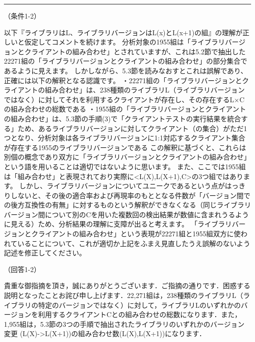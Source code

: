 \documentclass{jarticle} %
\def\subsection#1{ \vspace{1pc} {\gt #1} }
\def\nextans{ \vspace{2pc} \hrule }
\begin{document}
\newpage
\nextans
\subsection{（条件1-2）}

以下『ライブラリはL、ライブラリバージョンはL(x)とL(x+1)の組』の理解が正しいと仮定してコメントを続けます。
分析対象の1955組は「ライブラリバージョンとクライアントの組み合わせ」とされていますが、これは5.2節で抽出した22271組の「ライブラリバージョンとクライアントの組み合わせ」の部分集合であるように見えます。
しかしながら、5.3節を読みなおすとこれは誤解であり、正確には以下の解釈となる認識です。
・22271組の「ライブラリバージョンとクライアントの組み合わせ」は、238種類のライブラリL（ライブラリバージョンではなく）に対してそれを利用するクライアントが存在し、その存在するL×Cの組み合わせの総数である
・1955組の「ライブラリバージョンとクライアントの組み合わせ」は、5.3節の手順(3)で「クライアントテストの実行結果を統合する」ため、あるライブラリバージョンに対してクライアント（の集合）がただ1つとなり、分析対象は各ライブラリバージョンに1:1対応するクライアント集合が存在する1955のライブラリバージョンである
この解釈に基づくと、これらは別個の概念であり双方に「ライブラリバージョンとクライアントの組み合わせ」という語を用いることは適切ではないように思います。
また、ここでは1955組は「組み合わせ」と表現されており実際に<L(X),L(X+1),C>の3つ組ではあります。
しかし、ライブラリバージョンについてユニークであるという点がはっきりしないと、その後の適合率および再現率のもととなる件数が「バージョン間での後方互換性の有無」に対するものという解釈ができなくなる（同じライブラリバージョン間について別のCを用いた複数回の検出結果が数値に含まれうるように見える）ため、分析結果の理解に支障が出ると考えます。
「ライブラリバージョンとクライアントの組み合わせ」という表現が22271組と1955組双方に使われていることについて、これが適切か上記をふまえ見直したうえ誤解のないよう記述を修正してください。


\subsection{（回答1-2）}

貴重な御指摘を頂き，誠にありがとうございます．ご指摘の通りです．困惑する説明となったことお詫び申し上げます．22,271組は，238種類のライブラリL（ライブラリの特定のバージョンではなく）に対して，ライブラリLのいずれかのバージョンを利用するクライアントCとの組み合わせの総数になります．また，1,955組は，5.3節の3つの手順で抽出されたライブラリのいずれかのバージョン変更 (L(X)->L(X+1))の組み合わせ数(L(X),L(X+1))になります．
\end{document}
